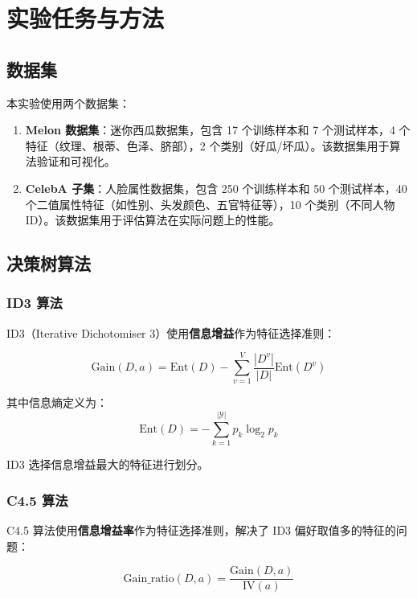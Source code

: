 \documentclass[UTF8]{ctexart}
\begin{document}
\section{实验任务与方法}

\subsection{数据集}
本实验使用两个数据集：
\begin{enumerate}
    \item \textbf{Melon 数据集}：迷你西瓜数据集，包含 17 个训练样本和 7 个测试样本，4 个特征（纹理、根蒂、色泽、脐部），2 个类别（好瓜/坏瓜）。该数据集用于算法验证和可视化。
    
    \item \textbf{CelebA 子集}：人脸属性数据集，包含 250 个训练样本和 50 个测试样本，40 个二值属性特征（如性别、头发颜色、五官特征等），10 个类别（不同人物 ID）。该数据集用于评估算法在实际问题上的性能。
\end{enumerate}

\subsection{决策树算法}

\subsubsection{ID3 算法}
ID3（Iterative Dichotomiser 3）使用\textbf{信息增益}作为特征选择准则：

\begin{equation}
\text{Gain}(D, a) = \text{Ent}(D) - \sum_{v=1}^{V}\frac{|D^v|}{|D|}\text{Ent}(D^v)
\end{equation}

\noindent 其中信息熵定义为：
\begin{equation}
\text{Ent}(D) = -\sum_{k=1}^{|\mathcal{Y}|}p_k\log_2 p_k
\end{equation}

\noindent ID3 选择信息增益最大的特征进行划分。

\subsubsection{C4.5 算法}
C4.5 算法使用\textbf{信息增益率}作为特征选择准则，解决了 ID3 偏好取值多的特征的问题：

\begin{equation}
\text{Gain\_ratio}(D, a) = \frac{\text{Gain}(D, a)}{\text{IV}(a)}
\end{equation}
\end{document}

